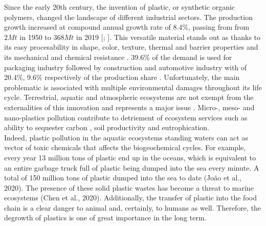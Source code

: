 \documentclass[]{elsarticle} %
\begin{document}
Since the early 20th century, the invention of plastic, or synthetic organic polymers, changed the landscape of different industrial sectors.
The production growth increased at compound annual growth rate of 8.4\%, passing from from \(2Mt\) in 1950 to \(368Mt\) in 2019 {[}\citet{Geyer2017}; {]}.
This versatile material stands out as thanks to its easy procesability in shape, color, texture, thermal and barrier properties and its mechanical and chemical resistance \citep[ ]{Andrady2009, Thompson2009a}.
39.6\% of the demand is used for packaging industry followed by construction and automotive industry with of 20.4\%, 9.6\% respectively of the production share \citep{ref}.
Unfortunately, the main problematic is associated with multiple environmental damages throughout its life cycle.
Terrestrial, aquatic and atmospheric ecosystems are not exempt from the externalities of this innovation and represents a major issue \citep{Kumar2021}.
Micro-, meso- and nano-plastics pollution contribute to detriement of ecosystem services such as ability to sequester carbon \citep{ref}, soil productivity \citep{ref} and eutrophication.\\
Indeed, plastic pollution in the aquatic ecosystems standing waters can act as vector of toxic chemicals that affects the biogeochemical cycles.
For example, every year 13 million tons of plastic end up in the oceans, which is equivalent to an entire garbage truck full of plastic being dumped into the sea every minute.
A total of 150 million tons of plastic dumped into the sea to date (João et al., 2020).
The presence of these solid plastic wastes has become a threat to marine ecosystems (Chen et al., 2020).
Additionally, the transfer of plastic into the food chain is a clear danger to animal and, certainly, to humans as well.
Therefore, the degrowth of plastics is one of great importance in the long term.
\end{document}
